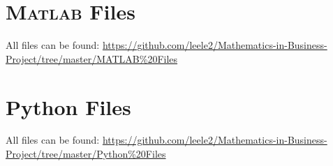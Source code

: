 \begin{appendices}
    \chapter{\textsc{Matlab} Files}
        All files can be found: \small{\url{https://github.com/leele2/Mathematics-in-Business-Project/tree/master/MATLAB%20Files}}

        

        

    \chapter{Python Files}
        All files can be found: \small{\url{https://github.com/leele2/Mathematics-in-Business-Project/tree/master/Python%20Files}}

        
\end{appendices}